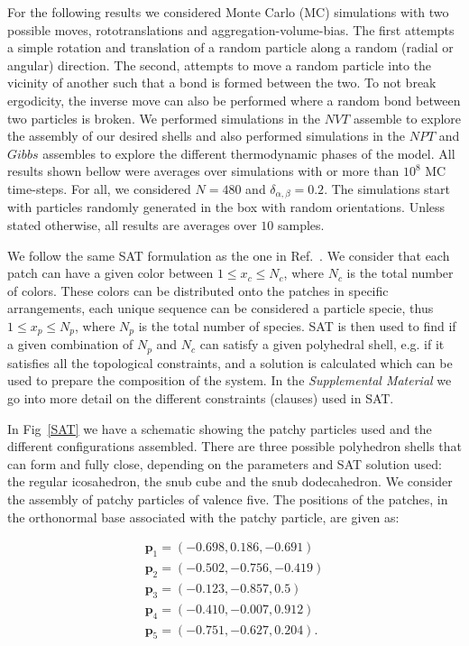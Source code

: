 \documentclass[a4paper, amsfonts, amssymb, amsmath, reprint, showkeys, nofootinbib, twoside]{revtex4-1}
\begin{document}
For the following results we considered Monte Carlo (MC) simulations with two possible moves, rototranslations and aggregation-volume-bias. The first attempts a simple rotation and translation of a random particle along a random (radial or angular) direction. The second, attempts to move a random particle into the vicinity of another such that a bond is formed between the two. To not break ergodicity, the inverse move can also be performed where a random bond between two particles is broken. We performed simulations in the $NVT$ assemble to explore the assembly of our desired shells and also performed simulations in the $NPT$ and $Gibbs$ assembles to explore the different thermodynamic phases of the model. All results shown bellow were averages over simulations with or more than $10^8$ MC time-steps. For all, we considered $N=480$ and $\delta_{\alpha, \beta}=0.2$. The simulations start with particles randomly generated in the box with random orientations. Unless stated otherwise, all results are averages over $10$ samples.

We follow the same SAT formulation as the one in Ref.~\cite{Russo2021}. We consider that each patch can have a given color between $1\leq x_c\leq N_c$, where $N_c$ is the total number of colors. These colors can be distributed onto the patches in specific arrangements, each unique sequence can be considered a particle specie, thus $1\leq x_p\leq N_p$, where $N_p$ is the total number of species. SAT is then used to find if a given combination of $N_p$ and $N_c$ can satisfy a given polyhedral shell, e.g. if it satisfies all the topological constraints, and a solution is calculated which can be used to prepare the composition of the system. In the \emph{Supplemental Material} we go into more detail on the different constraints (clauses) used in SAT.

In Fig~\ref{SAT} we have a schematic showing the patchy particles used and the different configurations assembled. There are three possible polyhedron shells that can form and fully close, depending on the parameters and SAT solution used: the regular icosahedron, the snub cube and the snub dodecahedron. We consider the assembly of patchy particles of valence five. The positions of the patches, in the orthonormal base associated with the patchy particle, are given as:

\begin{equation}
    \label{patch}
    \begin{aligned}
    \textbf{p}_1=(-0.698, 0.186, -0.691) \\
    \textbf{p}_2=(-0.502, -0.756, -0.419) \\
    \textbf{p}_3=(-0.123, -0.857, 0.5) \\ 
    \textbf{p}_4=(-0.410, -0.007, 0.912) \\
    \textbf{p}_5=(-0.751, -0.627, 0.204) .
    \end{aligned}
\end{equation}
\end{document}
